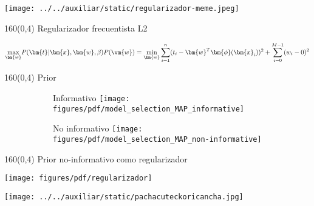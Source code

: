 \documentclass[shownotes,aspectratio=169]{beamer}
\begin{document}
\begin{frame}[plain]

\centering
\texttt{[image: ../../auxiliar/static/regularizador-meme.jpeg]} 

\end{frame}

\begin{frame}[plain]
\begin{textblock}{160}(0,4)
\centering \Large Regularizador frecuentista L2
\end{textblock}


\begin{equation*}
 \underset{\bm{w}}{\text{ max }} P(\bm{t} | \bm{x}, \bm{w}, \beta) P(\vm{w}) = \underset{\bm{w}}{\text{ min }} \sum_{i=1}^{n}  (t_i - \bm{w}^T\bm{\phi}(\bm{x}_i))^2 + \sum_{i=0}^{M-1} (w_i - 0 )^2
\end{equation*}




\end{frame}




\begin{frame}[plain]
\begin{textblock}{160}(0,4)
\centering \Large  Prior
\end{textblock}
\vspace{0.75cm}

       \begin{figure}[H]     
     \centering 
     \begin{subfigure}[b]{0.45\textwidth}
    \centering Informativo
    \texttt{[image: figures/pdf/model\_selection\_MAP\_informative]} 
     \end{subfigure}
       \begin{subfigure}[b]{0.45\textwidth}
     \centering 
     No informativo
    \texttt{[image: figures/pdf/model\_selection\_MAP\_non-informative]} 
   \end{subfigure}
\end{figure}

\end{frame}


\begin{frame}[plain]
\begin{textblock}{160}(0,4)
\centering \Large Prior no-informativo como regularizador
\end{textblock}
\vspace{0.75cm}

\centering
\texttt{[image: figures/pdf/regularizador]} 


\end{frame}




\begin{frame}[plain]

\centering
  \texttt{[image: ../../auxiliar/static/pachacuteckoricancha.jpg]}
\end{frame}
\end{document}
